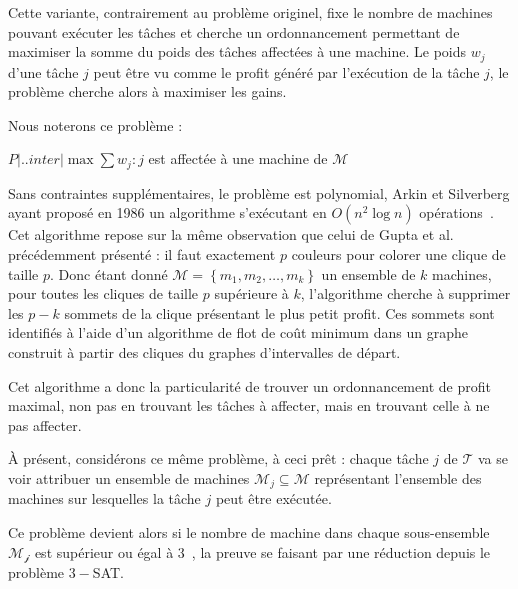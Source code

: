 \documentclass[a4paper,11pt]{article}
\begin{document}
Cette variante, contrairement au problème originel, fixe le nombre de machines pouvant exécuter les
tâches et cherche un ordonnancement permettant de maximiser la somme du poids des tâches affectées à
une machine. Le poids $w_j$ d'une tâche $j$ peut être vu comme le profit généré par l'exécution de
la tâche $j$, le problème cherche alors à maximiser les gains.

Nous noterons ce problème :
\begin{center}
    $P \Big| . . inter \Big| \max \sum w_j : j$ est affectée à une machine de $\mathcal{M}$
\end{center}

Sans contraintes supplémentaires, le problème est polynomial, Arkin et Silverberg ayant proposé en
1986 un algorithme s'exécutant en $O(n^2 \log n)$ opérations~\cite{arkin_scheduling_1987}. Cet
algorithme repose sur la même observation que celui de Gupta et al. précédemment présenté : il faut
exactement $p$ couleurs pour colorer une clique de taille $p$. Donc étant donné $\mathcal{M}=\left\{
m_1, m_2, \dots, m_k \right\}$ un ensemble de $k$ machines, pour toutes les cliques de taille
$p$ supérieure à $k$, l'algorithme cherche à supprimer les $p -k$ sommets de la clique présentant
le plus petit profit. Ces sommets sont identifiés à l'aide d'un algorithme de flot de coût minimum
dans un graphe construit à partir des cliques du graphes d'intervalles de départ.

Cet algorithme a donc la particularité de trouver un ordonnancement de profit maximal, non pas en
trouvant les tâches à affecter, mais en trouvant celle à ne pas affecter.

À présent, considérons ce même problème, à ceci prêt : chaque tâche $j$ de $\mathcal{T}$ va se voir
attribuer un ensemble de machines $\mathcal{M}_j \subseteq \mathcal{M}$ représentant l'ensemble des
machines sur lesquelles la tâche $j$ peut être exécutée.

Ce problème devient alors \npc si le nombre de machine dans chaque sous-ensemble $\mathcal{M_j}$ est
supérieur ou égal à $3$~\cite{arkin_scheduling_1987}, la preuve se faisant par une réduction depuis
le problème \textsc{$3-$SAT}.

\newpage
\appendix


\end{document}

